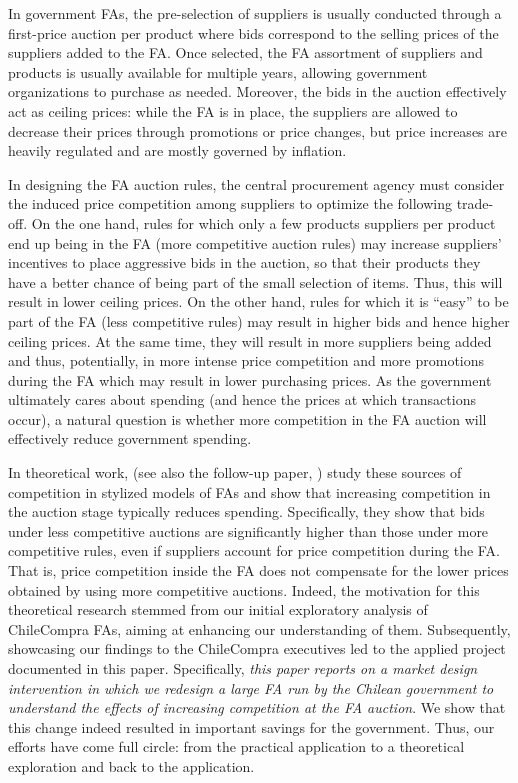 In government FAs, the pre-selection of suppliers is usually conducted through a first-price auction {per product} where bids correspond to the selling prices of the suppliers added to the FA. Once selected, the FA assortment of suppliers and products is usually available for multiple years, allowing government organizations to purchase as needed. Moreover, the bids in the auction effectively act as ceiling prices: while the FA is in place, the suppliers are allowed to decrease their prices through promotions or price changes, but price increases are heavily regulated and are mostly governed by inflation.

In designing the FA auction rules, the central procurement agency must consider the induced price competition among suppliers to optimize the following trade-off. On the one hand, rules for which only a few {products} {suppliers per product} end up being in the FA (more competitive auction rules) may increase suppliers' incentives to place aggressive bids in the auction, so that {their products} {they} have a better chance of being part of the small selection of items. Thus, this will result in lower ceiling prices. On the other hand, rules for which it is “easy” to be part of the FA (less competitive rules) may result in higher bids and hence higher ceiling prices. At the same time, they will result in more suppliers being added and thus, potentially, in more intense price competition and more promotions during the FA which may result in lower purchasing prices. As the government ultimately cares about spending (and hence the prices at which transactions occur), a natural question is whether more competition in the FA auction will effectively reduce government spending.

In theoretical work, \cite{saban2021procurement} (see also the follow-up paper, \cite{Choi22}) study these sources of competition in stylized models of FAs and show that increasing competition in the auction stage  typically reduces  spending. %
Specifically, they show that bids under less competitive auctions are significantly higher than those under more competitive  rules, even if suppliers account for price competition during the FA. That is, price competition inside the FA does not compensate for the lower prices obtained by using more competitive auctions. Indeed, the motivation for this theoretical research stemmed from our initial exploratory analysis of ChileCompra FAs, aiming at enhancing our understanding of them. Subsequently, showcasing our findings to the ChileCompra executives led to the applied project documented in this paper. 
Specifically, \textit{this paper reports on a market design intervention in which we redesign a large FA run by the Chilean government to understand the effects of increasing competition at the FA  auction}. We show that this change indeed resulted in important savings for the government.
Thus, our efforts have come full circle: from the practical application to a theoretical exploration and back to the application.


